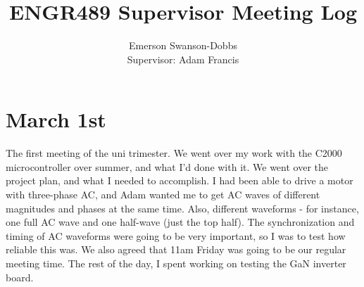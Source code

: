 \documentclass{article}
\title{ENGR489 Supervisor Meeting Log}
\author{Emerson Swanson-Dobbs\\Supervisor: Adam Francis}
\date{}
\begin{document}
\maketitle

\section*{March 1st}

The first meeting of the uni trimester. We went over my work with the C2000 microcontroller over summer, and what I'd done with it. We went over the project plan, and what I needed to accomplish. I had been able to drive a motor with three-phase AC, and Adam wanted me to get AC waves of different magnitudes and phases at the same time. Also, different waveforms - for instance, one full AC wave and one half-wave (just the top half). The synchronization and timing of AC waveforms were going to be very important, so I was to test how reliable this was. We also agreed that 11am Friday was going to be our regular meeting time. The rest of the day, I spent working on testing the GaN inverter board.
\end{document}
